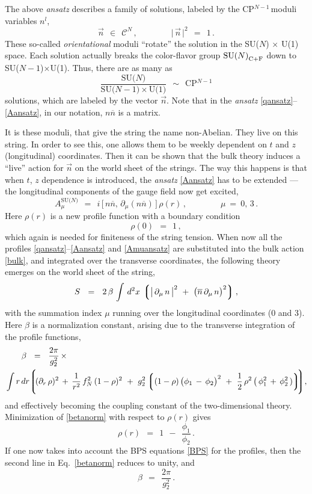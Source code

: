 \documentclass[12pt]{article}
\def\beq{\begin{equation}}
\def\eeq{\end{equation}}
\newcommand{\p}{\partial}
\newcommand{\ov}{\overline}
\newcommand{\mc}[1]{\mathcal{#1}}
\newcommand{\lgr}{\left\lgroup}
\newcommand{\rgr}{\right\rgroup}
\newcommand{\sunu}{{\rm SU($N$) $\times$ U(1) }}
\def\cfl {$\text{SU($N$)}_{\rm C+F}$ }
\newcommand{\nbar}{\ov{n}}
\newcommand{\nnbar}{n\ov{n}}
\newcommand{\cpn}{CP$^{N-1}$\,}
\newcommand{\ansatz}{{\it ansatz} }
\begin{document}
	The above \ansatz describes a family of solutions, labeled by the \cpn moduli variables $n^l$,
\beq
	\vec{n}    ~~\in~~    \mc{C}^N\,,
	\qquad\qquad
	\big|\, \vec{n} \,\big|^2    ~~=~~    1\,.
\eeq
	These so-called {\it orientational} moduli ``rotate'' the solution in the \sunu space.
	Each solution actually breaks the color-flavor group \cfl down to SU($N-1$)$\times$U(1).
	Thus, there are as many as
\beq
	\frac{\text{SU($N$)}}{\text{SU($N-1$)$\times$U(1)}}    ~~\sim~~    \text{CP$^{N-1}$}
\eeq
	solutions, which are labeled by the vector $ \vec{n} $.
	Note that in the \ansatz \eqref{qansatz}--\eqref{Aansatz}, in our notation, $ \nnbar $ is a matrix.

	It is these moduli, that give the string the name non-Abelian.
	They live on this string.
	In order to see this, one allows them to be weekly
	dependent on $ t $ and $ z $ (longitudinal) coordinates.
	Then it can be shown \cite{SYrev} that the bulk theory induces a ``live'' action for $ \vec{n} $
	on the world sheet of the strings.
	The way this happens is that when $ t $, $ z $ dependence is introduced, 
	the \ansatz \eqref{Aansatz} has to be extended --- 
	the longitudinal components of the gauge field now get excited,
\beq
\label{Amuansatz}
	A_\mu^\text{SU($N$)}    ~~=~~    i\, \big[\, \nnbar,\, \p_\mu(\nnbar) \,\big]\, \rho(r)\,,
	\qquad\qquad
	\mu ~=~ 0,\, 3\,.
\eeq
	Here $ \rho(r) $ is a new profile function with a boundary condition
\beq
	\rho(0)    ~~=~~    1\,,
\eeq
	which again is needed for finiteness of the string tension.
	When now all the profiles \eqref{qansatz}--\eqref{Aansatz} and \eqref{Amuansatz} are substituted into the
	bulk action \eqref{bulk}, and integrated over the transverse coordinates, the following theory emerges on the
	world sheet of the string,
\beq
\label{ws}
	S    ~~=~~    2\,\beta\, \int\, d^2x\, \lgr \big|\, \p_\mu\, n \,\big|^2  
					~+~  \big( \nbar\, \p_\mu\, n \big)^2 \rgr,
\eeq
	with the summation index $ \mu $ running over the longitudinal coordinates (0 and 3).
	Here $ \beta $ is a normalization constant, arising due to the transverse integration of the profile functions,
\begin{align}
%
\label{betanorm}
	&
	\qquad
	\beta    ~~=~~    	\frac{2\pi}{g_2^2}\, \times
	\\
%
\notag
	&
	\int r\, dr
		\Biggl\lgroup\!  (\p_r\, \rho)^2 \,+\, \frac{1}{r^2}\, f_N^2\, (1-\rho)^2 
			~+~  g_2^2 \lgr (1-\rho)\, \big( \phi_1 \,-\, \phi_2 \big)^2  ~+~
				\frac{1}{2}\, \rho^2\, \big(\, \phi_1^2 \,+\, \phi_2^2 \,) \rgr \!
		\!\Biggr\rgroup,
\end{align}
	and effectively becoming the coupling constant of the two-dimensional theory.
	Minimization of \eqref{betanorm} with respect to $ \rho(r) $ gives
\beq
	\rho(r)    ~~=~~    1  ~~-~~ \frac{\phi_1}{\phi_2}\,.
\eeq
	If one now takes into account the BPS equations \eqref{BPS} for the profiles, then the 
	second line in Eq.~\eqref{betanorm} reduces to unity, and
\beq
	\beta    ~~=~~    \frac{2\pi}{g_2^2}\,.
\eeq
	
\end{document}
